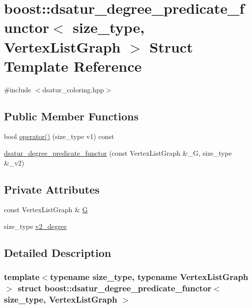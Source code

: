 \hypertarget{structboost_1_1dsatur__degree__predicate__functor}{}\section{boost\+:\+:dsatur\+\_\+degree\+\_\+predicate\+\_\+functor$<$ size\+\_\+type, Vertex\+List\+Graph $>$ Struct Template Reference}
\label{structboost_1_1dsatur__degree__predicate__functor}


{\ttfamily \#include $<$dsatur\+\_\+coloring.\+hpp$>$}

\subsection*{Public Member Functions}
\begin{DoxyCompactItemize}
\item 
bool \hyperlink{structboost_1_1dsatur__degree__predicate__functor_a8e980e76b15883b385c55c6f04b3d46a}{operator()} (size\+\_\+type v1) const
\item 
\hyperlink{structboost_1_1dsatur__degree__predicate__functor_af53e121e04a37b91085c5250cffd8ef5}{dsatur\+\_\+degree\+\_\+predicate\+\_\+functor} (const Vertex\+List\+Graph \&\+\_\+G, size\+\_\+type \&\+\_\+v2)
\end{DoxyCompactItemize}
\subsection*{Private Attributes}
\begin{DoxyCompactItemize}
\item 
const Vertex\+List\+Graph \& \hyperlink{structboost_1_1dsatur__degree__predicate__functor_a6b40fb25549a91d2990a1865e8a6cca6}{G}
\item 
size\+\_\+type \hyperlink{structboost_1_1dsatur__degree__predicate__functor_ac51a2be0b98d710913449b982d47909b}{v2\+\_\+degree}
\end{DoxyCompactItemize}


\subsection{Detailed Description}
\subsubsection*{template$<$typename size\+\_\+type, typename Vertex\+List\+Graph$>$\newline
struct boost\+::dsatur\+\_\+degree\+\_\+predicate\+\_\+functor$<$ size\+\_\+type, Vertex\+List\+Graph $>$}



